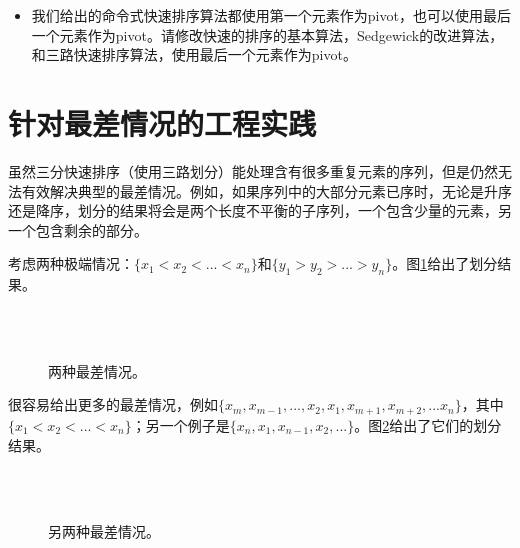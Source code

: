 \documentclass[UTF8]{article}
\begin{document}
\begin{Exercise}
\begin{itemize}
\item 我们给出的命令式快速排序算法都使用第一个元素作为pivot，也可以使用最后一个元素作为pivot。请修改快速的排序的基本算法，Sedgewick的改进算法，和三路快速排序算法，使用最后一个元素作为pivot。
\end{itemize}
\end{Exercise}

\section{针对最差情况的工程实践}

虽然三分快速排序（使用三路划分）能处理含有很多重复元素的序列，但是仍然无法有效解决典型的最差情况。例如，如果序列中的大部分元素已序时，无论是升序还是降序，划分的结果将会是两个长度不平衡的子序列，一个包含少量的元素，另一个包含剩余的部分。

考虑两种极端情况：$\{ x_1 < x_2 < ... < x_n\}$和$\{ y_1 > y_2 > ... > y_n\}$。图\ref{fig:worst-cases-1}给出了划分结果。

\begin{figure}[htbp]
   \centering
    \\
    \\
   \caption{两种最差情况。}
   \label{fig:worst-cases-1}
\end{figure}

很容易给出更多的最差情况，例如$\{ x_m, x_{m-1}, ..., x_2, x_1, x_{m+1}, x_{m+2}, ... x_n\}$，其中$\{ x_1 < x_2 < ... < x_n \}$；另一个例子是$\{x_n, x_1, x_{n-1}, x_2, ... \}$。图\ref{fig:worst-cases-2}给出了它们的划分结果。

\begin{figure}[htbp]
   \centering
    \\
    \\
   \caption{另两种最差情况。}
   \label{fig:worst-cases-2}
\end{figure}
\end{document}
